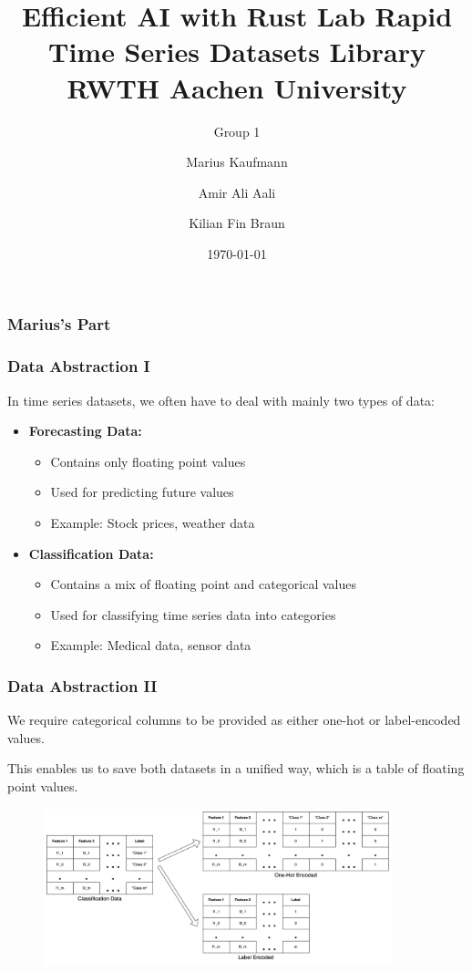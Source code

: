 \documentclass[t,english]{beamer}
\title[Rapid Time Series Datasets Library]{Efficient AI with Rust Lab \newline Rapid Time Series Datasets Library
\newline
RWTH Aachen University}
\subtitle{Group 1}
\author[Aali \& Kaufmann \& Braun]{Marius Kaufmann\inst{1} \and Amir Ali Aali\inst{2} \and Kilian Fin Braun\inst{1}}
\institute{
\inst{1}Masters of Computer Science\\
\inst{2}Masters of Data Science\\
}
\date{\small\today}
\begin{document}
\begin{frame}[plain]
\titlepage
\end{frame}

\addtocounter{framenumber}{-1}

\begin{frame}
  \frametitle{Marius's Part}
    
\end{frame}

\begin{frame}
  \frametitle{Data Abstraction I}
  In time series datasets, we often have to deal with mainly two types of data:
  \begin{itemize}[]
    \item \textbf{Forecasting Data:}
    \begin{itemize}
      \item Contains only floating point values
      \item Used for predicting future values
      \item Example: Stock prices, weather data
    \end{itemize}
    \item \textbf{Classification Data:}
    \begin{itemize}
      \item Contains a mix of floating point and categorical values
      \item Used for classifying time series data into categories
      \item Example: Medical data, sensor data
    \end{itemize}
  \end{itemize}
  
\end{frame}

\begin{frame}
  \frametitle{Data Abstraction II}
  We require categorical columns to be provided as either one-hot or label-encoded values.

  This enables us to save both datasets in a unified way, which is a table of floating point values.

  \begin{figure}[H]
    \includegraphics[width=0.9\textwidth]{figures/example_categorical.png}
  \end{figure}

\end{frame}
\end{document}
